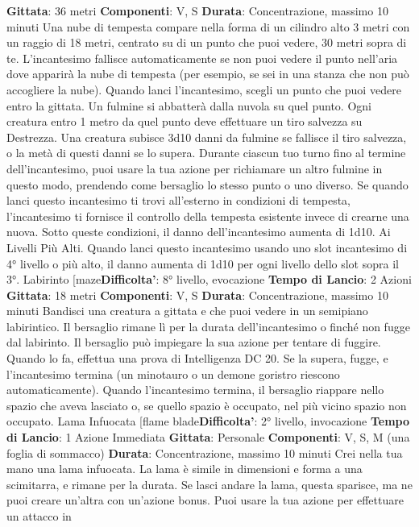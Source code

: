 \begin{multicols}{2}
\textbf{Gittata}: 36 metri
\textbf{Componenti}: V, S
\textbf{Durata}: Concentrazione, massimo 10 minuti
Una nube di tempesta compare nella forma di un
cilindro alto 3 metri con un raggio di 18 metri, centrato
su di un punto che puoi vedere, 30 metri sopra di te.
L’incantesimo fallisce automaticamente se non puoi
vedere il punto nell’aria dove apparirà la nube di
tempesta (per esempio, se sei in una stanza che non
può accogliere la nube).
Quando lanci l’incantesimo, scegli un punto che puoi
vedere entro la gittata. Un fulmine si abbatterà dalla
nuvola su quel punto. Ogni creatura entro 1 metro da
quel punto deve effettuare un tiro salvezza su
Destrezza. Una creatura subisce 3d10 danni da fulmine
se fallisce il tiro salvezza, o la metà di questi danni se lo
supera. Durante ciascun tuo turno fino al termine
dell’incantesimo, puoi usare la tua azione per
richiamare un altro fulmine in questo modo, prendendo
come bersaglio lo stesso punto o uno diverso.
Se quando lanci questo incantesimo ti trovi all’esterno
in condizioni di tempesta, l’incantesimo ti fornisce il
controllo della tempesta esistente invece di crearne una
nuova. Sotto queste condizioni, il danno
dell’incantesimo aumenta di 1d10.
Ai Livelli Più Alti. Quando lanci questo incantesimo
usando uno slot incantesimo di 4° livello o più alto, il
danno aumenta di 1d10 per ogni livello dello slot sopra
il 3°.
Labirinto
[maze\textbf{Difficolta'}:
8° livello, evocazione
\textbf{Tempo di Lancio}: 2 Azioni
\textbf{Gittata}: 18 metri
\textbf{Componenti}: V, S
\textbf{Durata}: Concentrazione, massimo 10 minuti
Bandisci una creatura a gittata e che puoi vedere in un
semipiano labirintico. Il bersaglio rimane lì per la durata
dell’incantesimo o finché non fugge dal labirinto.
Il bersaglio può impiegare la sua azione per tentare di
fuggire. Quando lo fa, effettua una prova di Intelligenza
DC 20. Se la supera, fugge, e l’incantesimo termina (un
minotauro o un demone goristro riescono
automaticamente).
Quando l’incantesimo termina, il bersaglio riappare
nello spazio che aveva lasciato o, se quello spazio è
occupato, nel più vicino spazio non occupato.
Lama Infuocata
[flame blade\textbf{Difficolta'}:
2° livello, invocazione
\textbf{Tempo di Lancio}: 1 Azione Immediata
\textbf{Gittata}: Personale
\textbf{Componenti}: V, S, M (una foglia di sommacco)
\textbf{Durata}: Concentrazione, massimo 10 minuti
Crei nella tua mano una lama infuocata. La lama è
simile in dimensioni e forma a una scimitarra, e rimane
per la durata. Se lasci andare la lama, questa sparisce,
ma ne puoi creare un’altra con un’azione bonus.
Puoi usare la tua azione per effettuare un attacco in

\end{multicols}
